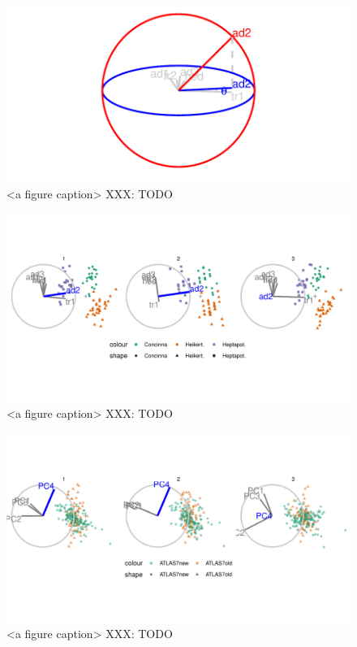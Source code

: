 \documentclass{monashthesis}
\begin{document}
\begin{figure}

{\centering \includegraphics[width=1\linewidth,]{./figures_from_script/ch3_fig2_manip_sp} 

}

\caption{<a figure caption> XXX: TODO}\label{fig:ch3fig2}
\end{figure}

\begin{figure}

{\centering \includegraphics[width=1\linewidth,]{./figures_from_script/ch3_fig3_filmstrip} 

}

\caption{<a figure caption> XXX: TODO}\label{fig:ch3fig3}
\end{figure}

\begin{figure}

{\centering \includegraphics[width=1\linewidth,]{./figures_from_script/ch3_fig4_jet_better_pc4} 

}

\caption{<a figure caption> XXX: TODO}\label{fig:ch3fig4}
\end{figure}
\end{document}
